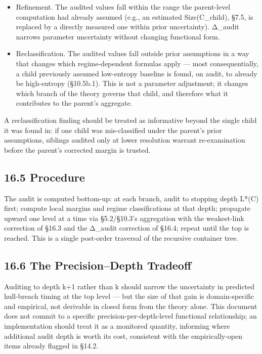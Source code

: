 \documentclass[
]{article}
\begin{document}
\begin{itemize}
\item
  Refinement. The audited values fall within the range the parent-level
  computation had already assumed (e.g., an estimated Size(C\_child),
  §7.5, is replaced by a directly measured one within prior
  uncertainty). Δ\_audit narrows parameter uncertainty without changing
  functional form.
\item
  Reclassification. The audited values fall outside prior assumptions in
  a way that changes which regime-dependent formulas apply --- most
  consequentially, a child previously assumed low-entropy baseline is
  found, on audit, to already be high-entropy (§10.5b.1). This is not a
  parameter adjustment; it changes which branch of the theory governs
  that child, and therefore what it contributes to the parent's
  aggregate.
\end{itemize}

A reclassification finding should be treated as informative beyond the
single child it was found in: if one child was mis-classified under the
parent's prior assumptions, siblings audited only at lower resolution
warrant re-examination before the parent's corrected margin is trusted.

\hypertarget{procedure}{%
\subsection{16.5 Procedure}\label{procedure}}

The audit is computed bottom-up: at each branch, audit to stopping depth
L*(C) first; compute local margins and regime classifications at that
depth; propagate upward one level at a time via §5.2/§10.3's aggregation
with the weakest-link correction of §16.3 and the Δ\_audit correction of
§16.4; repeat until the top is reached. This is a single post-order
traversal of the recursive container tree.

\hypertarget{the-precisiondepth-tradeoff}{%
\subsection{16.6 The Precision--Depth
Tradeoff}\label{the-precisiondepth-tradeoff}}

Auditing to depth k+1 rather than k should narrow the uncertainty in
predicted hull-breach timing at the top level --- but the size of that
gain is domain-specific and empirical, not derivable in closed form from
the theory alone. This document does not commit to a specific
precision-per-depth-level functional relationship; an implementation
should treat it as a monitored quantity, informing where additional
audit depth is worth its cost, consistent with the empirically-open
items already flagged in §14.2.
\end{document}
